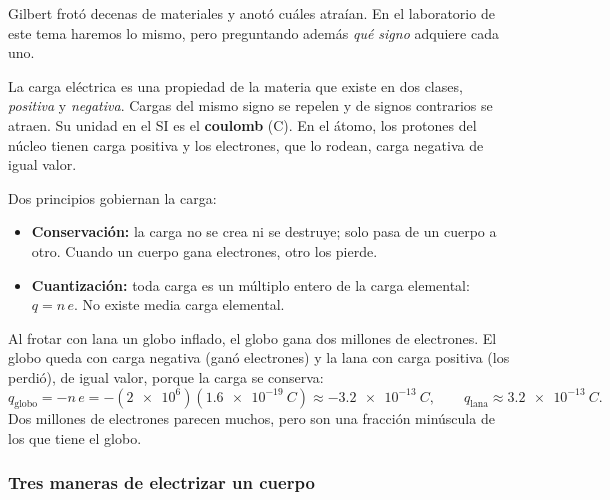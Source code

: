 \documentclass[11pt]{article}
\begin{document}
\begin{hilo}
Gilbert frotó decenas de materiales y anotó cuáles atraían. En el laboratorio
de este tema haremos lo mismo, pero preguntando además \emph{qué signo}
adquiere cada uno.
\end{hilo}

\begin{definicion}
La carga eléctrica es una propiedad de la materia que existe en dos clases,
\emph{positiva} y \emph{negativa}. Cargas del mismo signo se repelen y de
signos contrarios se atraen. Su unidad en el SI es el \textbf{coulomb} (C).
En el átomo, los protones del núcleo tienen carga positiva y los electrones,
que lo rodean, carga negativa de igual valor.
\end{definicion}

Dos principios gobiernan la carga:
\begin{itemize}
  \item \textbf{Conservación:} la carga no se crea ni se destruye; solo pasa
        de un cuerpo a otro. Cuando un cuerpo gana electrones, otro los pierde.
  \item \textbf{Cuantización:} toda carga es un múltiplo entero de la carga
        elemental: $q = n\,e$. No existe media carga elemental.
\end{itemize}

\begin{ejemplo}
Al frotar con lana un globo inflado, el globo gana dos millones de electrones.
El globo queda con carga negativa (ganó electrones) y la lana con carga
positiva (los perdió), de igual valor, porque la carga se conserva:
\[
  q_{\text{globo}} = -n\,e = -(\num{2e6})(\qty{1,6e-19}{C}) \approx
  \qty{-3,2e-13}{C}, \qquad q_{\text{lana}} \approx \qty{+3,2e-13}{C}.
\]
Dos millones de electrones parecen muchos, pero son una fracción minúscula de
los que tiene el globo.
\end{ejemplo}

\subsubsection*{Tres maneras de electrizar un cuerpo}
\end{document}
